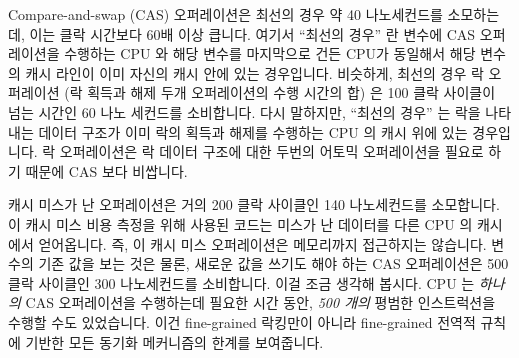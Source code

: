 Compare-and-swap (CAS) 오퍼레이션은 최선의 경우 약 40 나노세컨드를 소모하는데,
이는 클락 시간보다 60배 이상 큽니다.
여기서 ``최선의 경우'' 란 변수에 CAS 오퍼레이션을 수행하는 CPU 와 해당 변수를
마지막으로 건든 CPU가 동일해서 해당 변수의 캐시 라인이 이미 자신의 캐시 안에
있는 경우입니다.
비슷하게, 최선의 경우 락 오퍼레이션 (락 획득과 해제 두개 오퍼레이션의 수행
시간의 합) 은 100 클락 사이클이 넘는 시간인 60 나노 세컨드를 소비합니다.
다시 말하지만, ``최선의 경우'' 는 락을 나타내는 데이터 구조가 이미 락의 획득과
해제를 수행하는 CPU 의 캐시 위에 있는 경우입니다.
락 오퍼레이션은 락 데이터 구조에 대한 두번의 어토믹 오퍼레이션을 필요로 하기
때문에 CAS 보다 비쌉니다.

캐시 미스가 난 오퍼레이션은 거의 200 클락 사이클인 140 나노세컨드를 소모합니다.
이 캐시 미스 비용 측정을 위해 사용된 코드는 미스가 난 데이터를 다른 CPU 의
캐시에서 얻어옵니다. 즉, 이 캐시 미스 오퍼레이션은 메모리까지 접근하지는
않습니다.
변수의 기존 값을 보는 것은 물론, 새로운 값을 쓰기도 해야 하는 CAS 오퍼레이션은
500 클락 사이클인 300 나노세컨드를 소비합니다.
이걸 조금 생각해 봅시다.
CPU 는 \emph{하나의} CAS 오퍼레이션을 수행하는데 필요한 시간 동안, \emph{500
개의} 평범한 인스트럭션을 수행할 수도 있었습니다.
이건 fine-grained 락킹만이 아니라 fine-grained 전역적 규칙에 기반한 모든 동기화
메커니즘의 한계를 보여줍니다.

